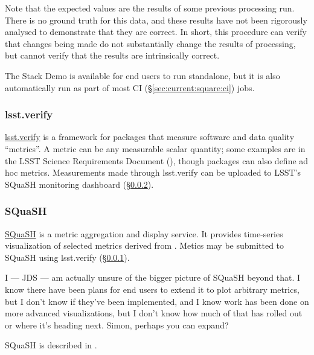 \documentclass[DM,authoryear,toc,lsstdraft]{lsstdoc}
\begin{document}
Note that the expected values are the results of some previous processing run.
There is no ground truth for this data, and these results have not been
rigorously analysed to demonstrate that they are correct. In short, this
procedure can verify that changes being made do not substantially change the
results of processing, but cannot verify that the results are intrinsically
correct.

The Stack Demo is available for end users to run standalone, but it is also
automatically run as part of most CI (\S\ref{sec:current:square:ci}) jobs.

\subsubsection{lsst.verify}
\label{sec:current:square:verify}


\href{https://github.com/lsst/verify}{lsst.verify} is a framework for packages
that measure software and data quality ``metrics''. A metric can be any
measurable scalar quantity; some examples are in the LSST Science Requirements
Document (), though packages can also define ad hoc metrics.
Measurements made through lsst.verify can be uploaded to LSST's SQuaSH
monitoring dashboard (\S\ref{sec:current:square:squash}).

\subsubsection{SQuaSH}
\label{sec:current:square:squash}

\href{https://squash.lsst.codes}{SQuaSH} is a metric aggregation and display
service. It provides time-series visualization of selected metrics derived
from . Metics may be submitted to SQuaSH using lsst.verify
(\S\ref{sec:current:square:verify}).

\begin{draftnote}
I --- JDS --- am actually unsure of the bigger picture of SQuaSH beyond that.
I know there have been plans for end users to extend it to plot arbitrary
metrics, but I don't know if they've been implemented, and I know work has
been done on more advanced visualizations, but I don't know how much of that
has rolled out or where it's heading next. Simon, perhaps you can expand?
\end{draftnote}

SQuaSH is described in .
\end{document}
